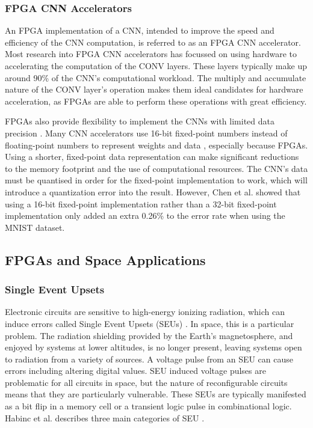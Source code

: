 \documentclass[12pt]{article}
\begin{document}
\subsubsection{FPGA CNN Accelerators}
\label{sec:Background-FpgaCnnImpl-Accel}


An FPGA implementation of a CNN, intended to improve the speed and efficiency of the CNN computation, is referred to as an FPGA CNN accelerator. Most research into FPGA CNN accelerators has focussed on using hardware to accelerating the computation of the CONV layers. These layers typically make up around 90\% of the CNN's computational workload. The multiply and accumulate nature of the CONV layer's operation makes them ideal candidates for hardware acceleration, as FPGAs are able to perform these operations with great efficiency. 

FPGAs also provide flexibility to implement the CNNs with limited data precision \cite{SudaFpgaAccelerator}. Many CNN accelerators use 16-bit fixed-point numbers instead of floating-point numbers to represent weights and data \cite{ZhangFpgaAccelerator}\cite{ChenFpgaAccelerator}\cite{FarabetFpgaAccelerator}, especially because FPGAs. Using a shorter, fixed-point data representation can make significant reductions to the memory footprint and the use of computational resources. The CNN's data must be quantised in order for the fixed-point implementation to work, which will introduce a quantization error into the result. However, Chen et al. showed that using a 16-bit fixed-point implementation rather than a 32-bit fixed-point implementation only added an extra 0.26\% to the error rate when using the MNIST dataset.

\subsection{FPGAs and Space Applications}
\label{sec:Background-FPGAsAndSpaceApplications}


\subsubsection{Single Event Upsets}
\label{sec:Background-FPGAsAndSpaceApplications-SEUs}


Electronic circuits are sensitive to high-energy ionizing radiation, which can induce errors called Single Event Upsets (SEUs) \cite{SeuTutorial}. In space, this is a particular problem. The radiation shielding provided by the Earth's magnetosphere, and enjoyed by systems at lower altitudes, is no longer present, leaving systems open to radiation from a  variety of sources. A voltage pulse from an SEU can cause errors including altering digital values. SEU induced voltage pulses are problematic for all circuits in space, but the nature of reconfigurable circuits means that they are particularly vulnerable. These SEUs are typically manifested as a bit flip in a memory cell or a transient logic pulse in combinational logic. Habinc et al. describes three main categories of SEU \cite{SuitabilityGaisler}.
\end{document}
